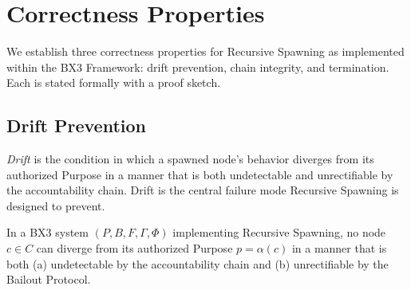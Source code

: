 \section{Correctness Properties}
\label{sec:correctness}

We establish three correctness properties for Recursive Spawning as implemented within the BX3 Framework: drift prevention, chain integrity, and termination. Each is stated formally with a proof sketch.

\subsection{Drift Prevention}
\label{sec:drift-prevention}

\textit{Drift} is the condition in which a spawned node's behavior diverges from its authorized Purpose in a manner that is both undetectable and unrectifiable by the accountability chain. Drift is the central failure mode Recursive Spawning is designed to prevent.

\begin{thrm}
\label{thrm:drift-prevention}
In a BX3 system $(P, B, F, \Gamma, \Phi)$ implementing Recursive Spawning, no node $c \in C$ can diverge from its authorized Purpose $p = \alpha(c)$ in a manner that is both (a) undetectable by the accountability chain and (b) unrectifiable by the Bailout Protocol.
\end{thrm}

